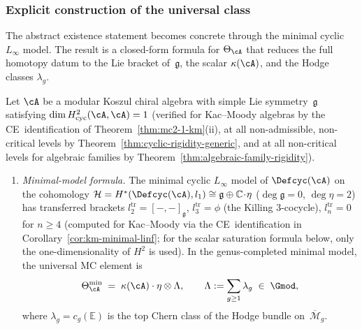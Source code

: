 \subsubsection*{Explicit construction of the universal class}

The abstract existence statement becomes concrete through
the minimal cyclic $L_\infty$ model.  The result is a closed-form
formula for $\Theta_{\cA}$ that reduces the full homotopy datum to
the Lie bracket of~$\mathfrak{g}$, the scalar $\kappa(\cA)$, and
the Hodge classes $\lambda_g$.

\begin{theorem}\label{thm:explicit-theta}
Let $\cA$ be a modular Koszul chiral algebra with simple Lie
symmetry~$\mathfrak{g}$ satisfying
$\dim H^2_{\mathrm{cyc}}(\cA,\cA) = 1$
\textup{(}verified for Kac--Moody algebras by the
CE~identification of
Theorem~\textup{\ref{thm:mc2-1-km}}\textup{(ii)},
at all non-admissible, non-critical levels by
Theorem~\textup{\ref{thm:cyclic-rigidity-generic}},
and at all non-critical levels for algebraic families by
Theorem~\textup{\ref{thm:algebraic-family-rigidity}}\textup{)}.
\begin{enumerate}[label=\textup{(\alph*)}]

\item \emph{Minimal-model formula.}
  The minimal cyclic $L_\infty$ model of $\Defcyc(\cA)$ on the
  cohomology
  $\mathcal{H} = H^*(\Defcyc(\cA), l_1) \cong \mathfrak{g} \oplus
  \mathbb{C}\!\cdot\!\eta$
  \textup{(}$\deg \mathfrak{g} = 0$, $\deg\eta = 2$\textup{)} has
  transferred brackets $l_2^{\mathrm{tr}} = [-,-]_{\mathfrak{g}}$,
  $l_3^{\mathrm{tr}} = \phi$
  \textup{(}the Killing $3$-cocycle\textup{)},
  $l_n^{\mathrm{tr}} = 0$ for $n \geq 4$
  \textup{(}computed for Kac--Moody via the CE~identification
  in Corollary~\textup{\ref{cor:km-minimal-linf}};
  for the scalar saturation formula below, only the
  one-dimensionality of\/ $H^2$ is used\textup{)}.
  In the genus-completed minimal model, the universal MC element
  is
  \begin{equation}\label{eq:theta-minimal}
  \Theta_{\cA}^{\min}
  \;=\;
  \kappa(\cA) \cdot \eta \otimes \Lambda,
  \qquad
  \Lambda := \sum_{g \geq 1} \lambda_g \;\in\; \Gmod,
  \end{equation}
  where $\lambda_g = c_g(\mathbb{E})$ is the top Chern class of the
  Hodge bundle on~$\overline{\mathcal{M}}_g$.


\end{enumerate}
\end{theorem}
